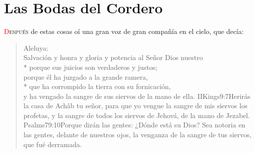 
\chapter{Las Bodas del Cordero}
\lettrine[lines=3,lraise=0.4]{\textcolor{red}{D}}{espués} de estas cosas oí una gran voz de gran compañía%
 en el cielo, que decía:
\zz \begin{verse}
Aleluya:\\
Salvación y honra y gloria y potencia al Señor Dios nuestro\\*\vin
{}porque sus juicios son verdaderos y justos;\\
porque él ha juzgado a la grande ramera,\\*\vin
que ha corrompido la tierra con su fornicación,\\
y ha vengado la sangre de sus siervos de la mano de ella.%
				{IIKings}{9:7}{Herirás la casa de Achâb tu señor, para que yo vengue la sangre de mis siervos los profetas, y la sangre de todos los siervos de Jehová, de la mano de Jezabel.}%
				{Psalms}{79:10}{Porque dirán las gentes: ¿Dónde está su Dios? Sea notoria en las gentes, delante de nuestros ojos, la venganza de la sangre de tus siervos, que fué derramada.}
\end{verse}

